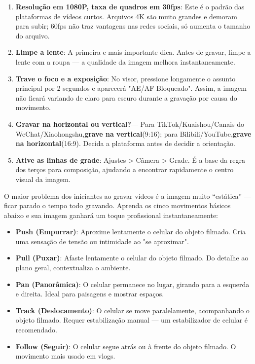 \begin{enumerate}
  \item \textbf{Resolução em 1080P, taxa de quadros em 30fps}: Este é o padrão das plataformas de vídeos curtos. Arquivos 4K são muito grandes e demoram para subir; 60fps não traz vantagens nas redes sociais, só aumenta o tamanho do arquivo.
  \item \textbf{Limpe a lente}: A primeira e mais importante dica. Antes de gravar, limpe a lente com a roupa — a qualidade da imagem melhora instantaneamente.
  \item \textbf{Trave o foco e a exposição}: No visor, pressione longamente o assunto principal por 2 segundos e aparecerá "AE/AF Bloqueado". Assim, a imagem não ficará variando de claro para escuro durante a gravação por causa do movimento.
  \item \textbf{Gravar na horizontal ou vertical?}— Para TikTok/Kuaishou/Canais do WeChat/Xiaohongshu,\textbf{grave na vertical}(9:16); para Bilibili/YouTube,\textbf{grave na horizontal}(16:9). Decida a plataforma antes de decidir a orientação.
  \item \textbf{Ative as linhas de grade}: Ajustes > Câmera > Grade. É a base da regra dos terços para composição, ajudando a encontrar rapidamente o centro visual da imagem.
\end{enumerate}


O maior problema dos iniciantes ao gravar vídeos é a imagem muito “estática” — ficar parado o tempo todo gravando. Aprenda os cinco movimentos básicos abaixo e sua imagem ganhará um toque profissional instantaneamente:

\begin{itemize}
  \item \textbf{Push (Empurrar)}: Aproxime lentamente o celular do objeto filmado. Cria uma sensação de tensão ou intimidade ao "se aproximar".
  \item \textbf{Pull (Puxar)}: Afaste lentamente o celular do objeto filmado. Do detalhe ao plano geral, contextualiza o ambiente.
  \item \textbf{Pan (Panorâmica)}: O celular permanece no lugar, girando para a esquerda e direita. Ideal para paisagens e mostrar espaços.
  \item \textbf{Track (Deslocamento)}: O celular se move paralelamente, acompanhando o objeto filmado. Requer estabilização manual — um estabilizador de celular é recomendado.
  \item \textbf{Follow (Seguir)}: O celular segue atrás ou à frente do objeto filmado. O movimento mais usado em vlogs.
\end{itemize}

